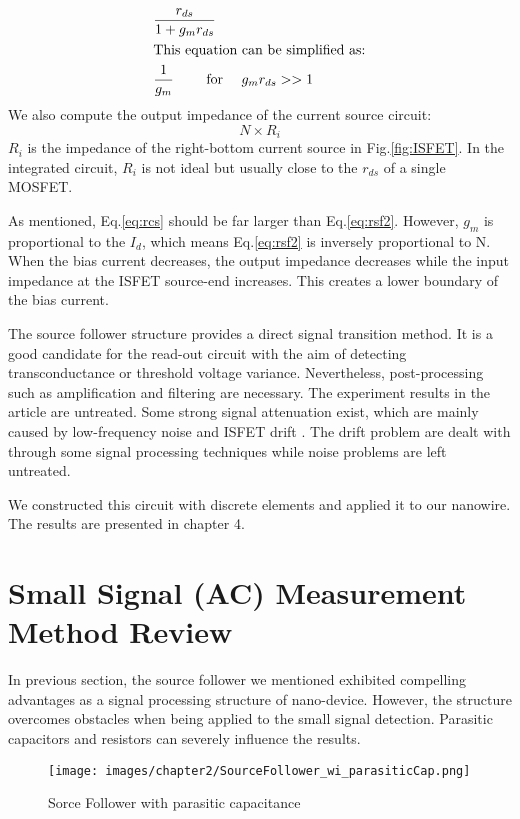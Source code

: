 \begin{align}
    & \frac{r_{ds}}{1 + g_mr_{ds}}\\
\intertext{This equation can be simplified as:}
    & \frac{1}{g_m} \qquad \text{ for } \quad g_mr_{ds} >> 1 \label{eq:rsf2}
\end{align}
We also compute the output impedance of the current source circuit:
\begin{equation} \label{eq:rcs}
    N\times R_i
\end{equation}
$R_i$ is the impedance of the right-bottom current source in Fig.\ref{fig:ISFET}.
In the integrated circuit, $R_i$ is not ideal but usually close to the $r_{ds}$ of a single MOSFET.

As mentioned, Eq.\ref{eq:rcs} should be far larger than Eq.\ref{eq:rsf2}.
However, $g_m$ is proportional to the $I_d$, which means Eq.\ref{eq:rsf2} is inversely proportional to N.
When the bias current decreases, the output impedance decreases while the input impedance at the ISFET source-end increases.
This creates a lower boundary of the bias current.

The source follower structure provides a direct signal transition method.
It is a good candidate for the read-out circuit with the aim of detecting transconductance or threshold voltage variance.
Nevertheless, post-processing such as amplification and filtering are necessary.
The experiment results in the article are untreated.
Some strong signal attenuation exist, which are mainly caused by low-frequency noise and ISFET drift \cite{Drift}.
The drift problem are dealt with through some signal processing techniques while noise problems are left untreated.

We constructed this circuit with discrete elements and applied it to our nanowire. The results are presented in chapter 4.


\section{Small Signal (AC) Measurement Method Review}
In previous section, the source follower we mentioned exhibited compelling advantages as a signal processing structure of nano-device.
However, the structure overcomes obstacles when being applied to the small signal detection.
Parasitic capacitors and resistors can severely influence the results.

\begin{figure}[h]
    \centering
    \texttt{[image: images/chapter2/SourceFollower\_wi\_parasiticCap.png]}
    \fontsize{6}{7}\selectfont
    \caption{Sorce Follower with parasitic capacitance}
    \label{fig:SF_pC}
\end{figure}

